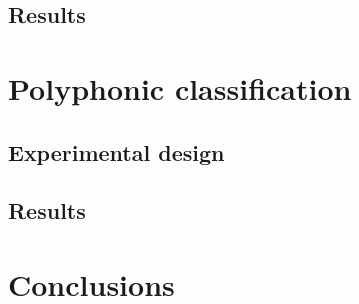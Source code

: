 \documentclass{article}
\begin{document}
\subsection{Results}


\section{Polyphonic classification}\label{sec:polyphonic}
\subsection{Experimental design}

\subsection{Results}


\section{Conclusions}


\end{document}
